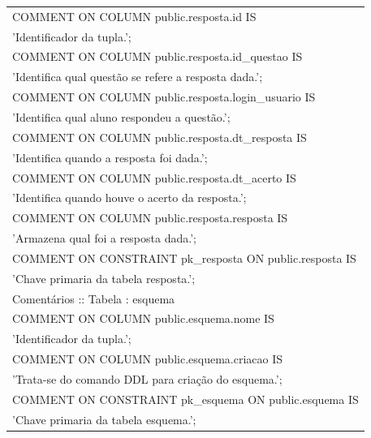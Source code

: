 \documentclass[graduacao,brazil]{ThesisPUC}
\begin{document}
\begin{table}[H]
{\begin{tabular}{|l|}
    COMMENT ON COLUMN public.resposta.id IS \\'Identificador da tupla.'; \\COMMENT ON COLUMN public.resposta.id\_questao IS \\'Identifica qual questão se refere a resposta dada.'; \\COMMENT ON COLUMN public.resposta.login\_usuario IS \\'Identifica qual aluno respondeu a questão.'; \\COMMENT ON COLUMN public.resposta.dt\_resposta IS \\'Identifica quando a resposta foi dada.'; \\COMMENT ON COLUMN public.resposta.dt\_acerto IS \\'Identifica quando houve o acerto da resposta.'; \\COMMENT ON COLUMN public.resposta.resposta IS \\'Armazena qual foi a resposta dada.'; \\COMMENT ON CONSTRAINT pk\_resposta ON public.resposta IS \\'Chave primaria da tabela resposta.'; \\ \hline
    Comentários :: Tabela : esquema                                                                                                                                                                                                                                                                                                                                                                                                                                                                                                                                                                                                                                    \\ \hline
    COMMENT ON COLUMN public.esquema.nome IS \\'Identificador da tupla.'; \\COMMENT ON COLUMN public.esquema.criacao IS \\'Trata-se do comando DDL para criação do esquema.'; \\COMMENT ON CONSTRAINT pk\_esquema ON public.esquema IS \\'Chave primaria da tabela esquema.';                                                                                                                                                                                                                                                                                                                                                                                          \\ \hline

\end{tabular}}
\end{table}
\end{document}

